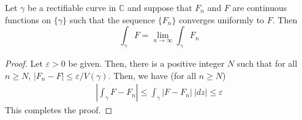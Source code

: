 \begin{lemma}
    Let $\gamma$ be a rectifiable curve in $\mathbb C$ and suppose that $F_n$ and $F$ are continuous functions on $\{\gamma\}$ such that the sequence $\{F_n\}$ converges uniformly to $F$. Then 
    \begin{equation*}
        \int_\gamma F = \lim_{n\to\infty}\int_\gamma F_n
    \end{equation*}
\end{lemma}
\begin{proof}
    Let $\varepsilon > 0$ be given. Then, there is a positive integer $N$ such that for all $n\ge N$, $|F_n - F|\le\varepsilon/V(\gamma)$. Then, we have (for all $n\ge N$)
    \begin{align*}
        \left|\int_\gamma F - F_n\right|\le\int_\gamma|F - F_n|~|dz|\le\varepsilon
    \end{align*}
    This completes the proof.
\end{proof}

